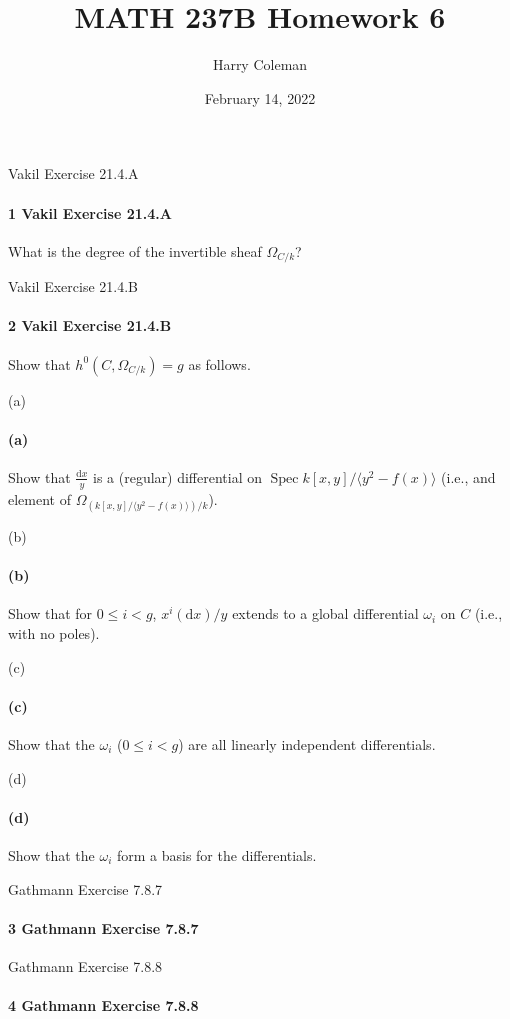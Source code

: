 \documentclass[12pt]{article}
\renewcommand{\maketitle}{\thispagestyle{title}}
\newlength{\myparskip}
\newenvironment{fullbox}{\begin{lrbox}{\savefullbox}\begin{minipage}{\dimexpr\textwidth-2\fboxsep\relax}\setlength{\parskip}{\myparskip}}{\end{minipage}\end{lrbox}\framebox[\textwidth]{\usebox{\savefullbox}}}
\newenvironment{pbox}[1][]{\begin{fullbox}\ifx#1\empty\else\paragraph{#1}\phantom{}\fi}{\end{fullbox}}
\theoremstyle{definition}
\newcommand{\<}{\langle}
\renewcommand{\>}{\rangle}
\DeclareMathOperator{\Spec}{Spec}
\newcommand{\dd}{\mathrm{d}}
\begin{document}
\title{MATH 237B Homework 6}
\author{Harry Coleman}
\date{February 14, 2022}
\maketitle

\begin{pbox}[1 Vakil Exercise 21.4.A]
    What is the degree of the invertible sheaf $\Omega_{C/k}$?
\end{pbox}

\begin{pbox}[2 Vakil Exercise 21.4.B]
    Show that $h^0(C, \Omega_{C/k}) = g$ as follows.
\end{pbox}

\begin{pbox}[(a)]
    Show that $\frac{\dd x}{y}$ is a (regular) differential on $\Spec k[x, y]/\<y^2 - f(x)\>$ (i.e., and element of $\Omega_{(k[x, y]/\<y^2 - f(x)\>)/k}$).
\end{pbox}

\begin{pbox}[(b)]
    Show that for $0 \leq i < g$, $x^i(\dd x)/y$ extends to a global differential $\omega_i$ on $C$ (i.e., with no poles).
\end{pbox}

\begin{pbox}[(c)]
    Show that the $\omega_i$ ($0 \leq i < g$) are all linearly independent differentials.
\end{pbox}

\begin{pbox}[(d)]
    Show that the $\omega_i$ form a basis for the differentials.
\end{pbox}

\begin{pbox}[3 Gathmann Exercise 7.8.7]
    
\end{pbox}

\begin{pbox}[4 Gathmann Exercise 7.8.8]
    
\end{pbox}
\end{document}

